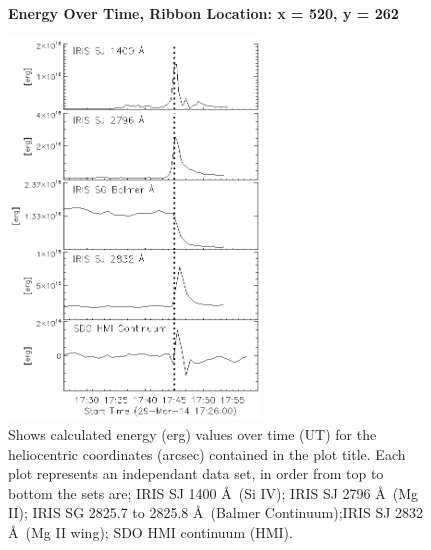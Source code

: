 \begin{figure}[H]
  \begin{center}
  \textbf{Energy Over Time, Ribbon Location: x = 520, y = 262 }\par\medskip
  \includegraphics[width=0.6\textwidth]{29-Mar-14-Ribbon-xyPosition-520-262-Frame-1-Energy-Ladder}
  \end{center}
  \caption{Shows calculated energy (erg) values over time (UT) for the heliocentric coordinates (arcsec) contained in the plot title. Each plot represents an independant data set, in order from top to bottom the sets are; IRIS SJ 1400 \AA\ (Si IV); IRIS SJ 2796 \AA\ (Mg II); IRIS SG  2825.7 to 2825.8 \AA\ (Balmer Continuum);IRIS SJ 2832 \AA\ (Mg II wing); SDO HMI continuum (HMI).}\label{erb4}
\end{figure}

